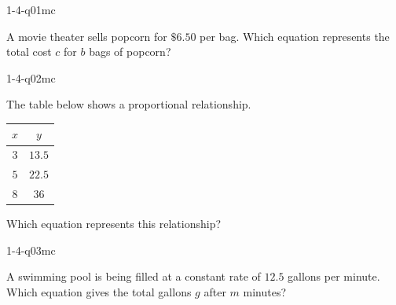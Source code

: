 

\begin{practiceQuestion}{1-4-q01}{mc}
\begin{questionText}
A movie theater sells popcorn for $\$6.50$ per bag. Which equation represents the total cost $c$ for $b$ bags of popcorn?
\end{questionText}
\end{practiceQuestion}

\begin{practiceQuestion}{1-4-q02}{mc}
\begin{questionText}
The table below shows a proportional relationship.

\begin{center}
\begin{tabular}{|c|c|}
\hline
$x$ & $y$ \\
\hline
$3$ & $13.5$ \\
$5$ & $22.5$ \\
$8$ & $36$ \\
\hline
\end{tabular}
\end{center}

Which equation represents this relationship?
\end{questionText}
\end{practiceQuestion}

\begin{practiceQuestion}{1-4-q03}{mc}
\begin{questionText}
A swimming pool is being filled at a constant rate of $12.5$ gallons per minute. Which equation gives the total gallons $g$ after $m$ minutes?
\end{questionText}
\end{practiceQuestion}


